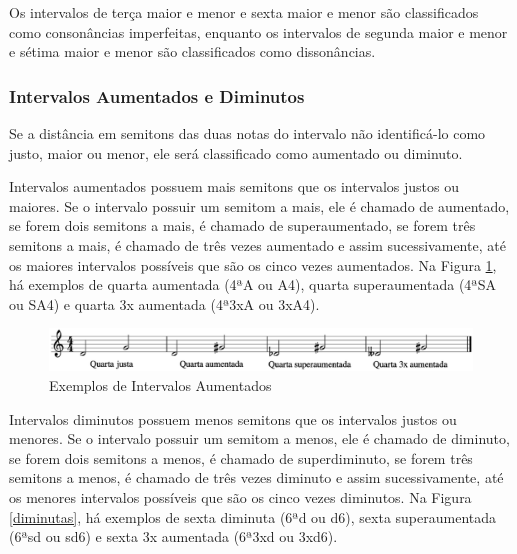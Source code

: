         Os intervalos de terça maior e menor e sexta maior e menor são classificados como consonâncias imperfeitas, enquanto os intervalos de segunda maior e menor e sétima maior e menor são classificados como dissonâncias.

      \subsubsection[Intervalos Aumentados e Diminutos]{Intervalos Aumentados e Diminutos}

        Se a distância em semitons das duas notas do intervalo não identificá-lo como justo, maior ou menor, ele será classificado como aumentado ou diminuto.

        Intervalos aumentados possuem mais semitons que os intervalos justos ou maiores. Se o intervalo possuir um semitom a mais, ele é chamado de aumentado, se forem dois semitons a mais, é chamado de superaumentado, se forem três semitons a mais, é chamado de três vezes aumentado e assim sucessivamente, até os maiores intervalos possíveis que são os cinco vezes aumentados. Na Figura \ref{aumentadas}, há exemplos de quarta aumentada (4ªA ou A4), quarta superaumentada (4ªSA ou SA4\footnotemark {}) e quarta 3x aumentada (4ª3xA ou 3xA4\footnotemark {}).

        \begin{figure}[htb]
          \centering
          \includegraphics[scale=0.35]{figuras/aumentadas.eps}
          \caption{Exemplos de Intervalos Aumentados}
          \label{aumentadas}
        \end{figure}

        Intervalos diminutos possuem menos semitons que os intervalos justos ou menores. Se o intervalo possuir um semitom a menos, ele é chamado de diminuto, se forem dois semitons a menos, é chamado de superdiminuto, se forem três semitons a menos, é chamado de três vezes diminuto e assim sucessivamente, até os menores intervalos possíveis que são os cinco vezes diminutos. Na Figura \ref{diminutas}, há exemplos de sexta diminuta (6ªd ou d6), sexta superaumentada (6ªsd ou sd6\footnotemark {}) e sexta 3x aumentada (6ª3xd ou 3xd6\footnotemark {}).

